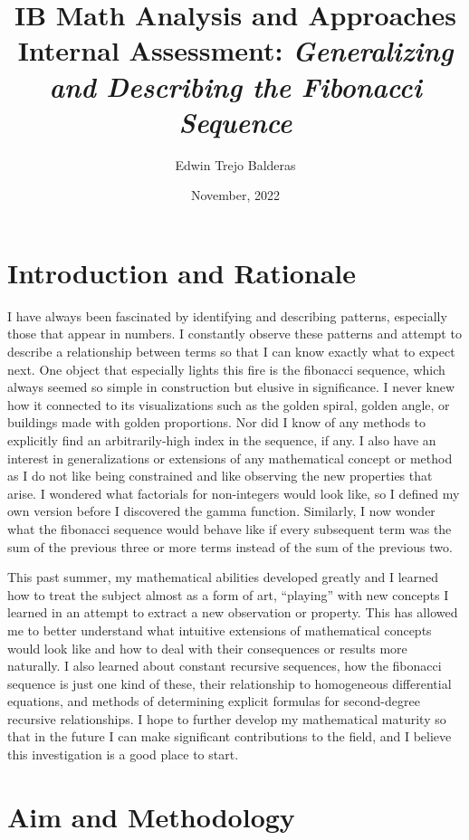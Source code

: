 \documentclass[11pt]{article}
\title{IB Math Analysis and Approaches Internal Assessment: \emph{Generalizing and Describing the Fibonacci Sequence}}
\author{Edwin Trejo Balderas}
\date{November, 2022}
\begin{document}
\singlespacing

\maketitle

\doublespacing

\section{Introduction and Rationale}

I have always been fascinated by identifying and describing patterns, especially those that appear in numbers. I constantly observe these patterns and attempt to describe a relationship between terms so that I can know exactly what to expect next. One object that especially lights this fire is the fibonacci sequence, which always seemed so simple in construction but elusive in significance. I never knew how it connected to its visualizations such as the golden spiral, golden angle, or buildings made with golden proportions. Nor did I know of any methods to explicitly find an arbitrarily-high index in the sequence, if any. I also have an interest in generalizations or extensions of any mathematical concept or method as I do not like being constrained and like observing the new properties that arise. I wondered what factorials for non-integers would look like, so I defined my own version before I discovered the gamma function. Similarly, I now wonder what the fibonacci sequence would behave like if every subsequent term was the sum of the previous three or more terms instead of the sum of the previous two. 

This past summer, my mathematical abilities developed greatly and I learned how to treat the subject almost as a form of art, “playing” with new concepts I learned in an attempt to extract a new observation or property. This has allowed me to better understand what intuitive extensions of mathematical concepts would look like and how to deal with their consequences or results more naturally. I also learned about constant recursive sequences, how the fibonacci sequence is just one kind of these, their relationship to homogeneous differential equations, and methods of determining explicit formulas for second-degree recursive relationships. I hope to further develop my mathematical maturity so that in the future I can make significant contributions to the field, and I believe this investigation is a good place to start.

\section{Aim and Methodology}
\end{document}
